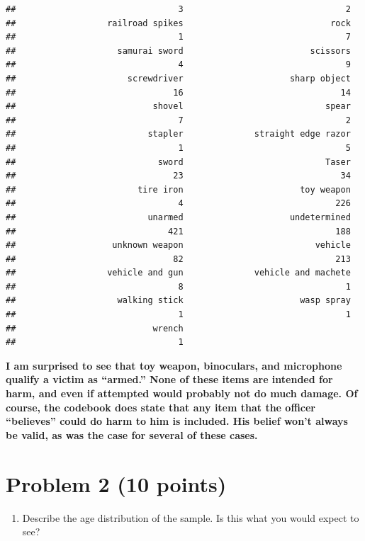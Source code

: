 \documentclass[
]{article}
\providecommand{\tightlist}{%
  \setlength{\itemsep}{0pt}\setlength{\parskip}{0pt}}
\begin{document}
\begin{verbatim}
##                                3                                2 
##                  railroad spikes                             rock 
##                                1                                7 
##                    samurai sword                         scissors 
##                                4                                9 
##                      screwdriver                     sharp object 
##                               16                               14 
##                           shovel                            spear 
##                                7                                2 
##                          stapler              straight edge razor 
##                                1                                5 
##                            sword                            Taser 
##                               23                               34 
##                        tire iron                       toy weapon 
##                                4                              226 
##                          unarmed                     undetermined 
##                              421                              188 
##                   unknown weapon                          vehicle 
##                               82                              213 
##                  vehicle and gun              vehicle and machete 
##                                8                                1 
##                    walking stick                       wasp spray 
##                                1                                1 
##                           wrench 
##                                1
\end{verbatim}

\textbf{I am surprised to see that toy weapon, binoculars, and
microphone qualify a victim as ``armed.'' None of these items are
intended for harm, and even if attempted would probably not do much
damage. Of course, the codebook does state that any item that the
officer ``believes'' could do harm to him is included. His belief won't
always be valid, as was the case for several of these cases. }

\hypertarget{problem-2-10-points}{%
\section{Problem 2 (10 points)}\label{problem-2-10-points}}

\begin{enumerate}
\def\labelenumi{\alph{enumi}.}
\tightlist
\item
  Describe the age distribution of the sample. Is this what you would
  expect to see?
\end{enumerate}
\end{document}
